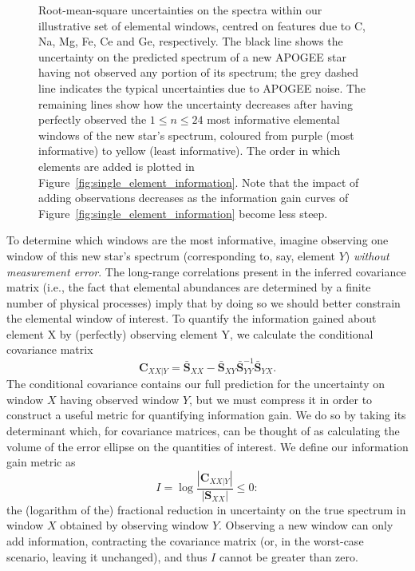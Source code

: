 \documentclass[a4paper,fleqn,usenatbib]{mnras}
\newcommand{\speccov}{{\bm S}}
\newcommand{\condcov}{{\bm C}}
\begin{document}
\begin{figure}
    \caption{Root-mean-square uncertainties on the spectra within our illustrative set of elemental windows, centred on features due to C, Na, Mg, Fe, Ce and Ge, respectively. The black line shows the uncertainty on the predicted spectrum of a new APOGEE star having not observed any portion of its spectrum; the grey dashed line indicates the typical uncertainties due to APOGEE noise. The remaining lines show how the uncertainty decreases after having perfectly observed the $1 \le n \le 24$ most informative elemental windows of the new star's spectrum, coloured from purple (most informative) to yellow (least informative). The order in which elements are added is plotted in Figure~\ref{fig:single_element_information}. Note that the impact of adding observations decreases as the information gain curves of Figure~\ref{fig:single_element_information} become less steep.}
    \label{fig:single_element_errs}
\end{figure}


To determine which windows are the most informative, imagine observing one window of this new star's spectrum (corresponding to, say, element $Y$) {\it without measurement error}. The long-range correlations present in the inferred covariance matrix (i.e., the fact that elemental abundances are determined by a finite number of physical processes) imply that by doing so we should better constrain the elemental window of interest. To quantify the information gained about element X by (perfectly) observing element Y, we calculate the conditional covariance matrix
\begin{equation}
\condcov_{XX|Y} = \bar{\speccov}_{XX} - \bar{\speccov}_{XY} \bar{\speccov}_{YY}^{-1} \bar{\speccov}_{YX}.
\end{equation}
The conditional covariance contains our full prediction for the uncertainty on window $X$ having observed window $Y$, but we must compress it in order to construct a useful metric for quantifying information gain. We do so by taking its determinant which, for covariance matrices, can be thought of as calculating the volume of the error ellipse on the quantities of interest. We define our information gain metric as
\begin{equation}
I = \log \frac{ \left| \condcov_{XX|Y} \right| }{ \left| \speccov_{XX} \right| } \le 0:
\end{equation}
the (logarithm of the) fractional reduction in uncertainty on the true spectrum in window $X$ obtained by observing window $Y$. Observing a new window can only add information, contracting the covariance matrix (or, in the worst-case scenario, leaving it unchanged), and thus $I$ cannot be greater than zero.
\end{document}
